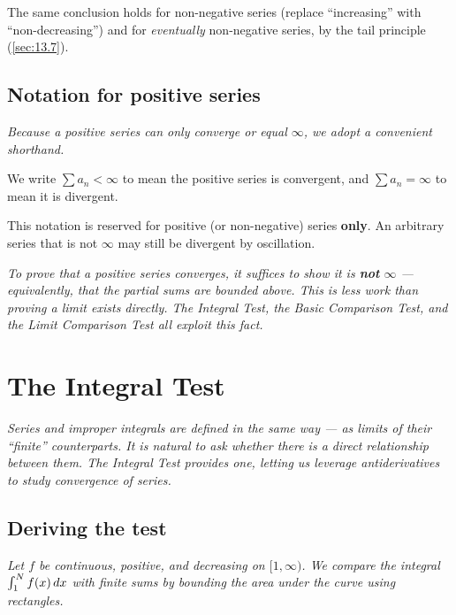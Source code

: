 \begin{remark}
The same conclusion holds for non-negative series (replace ``increasing'' with ``non-decreasing'') and for \emph{eventually} non-negative series, by the tail principle (\cref{sec:13.7}).
\end{remark}

\subsection*{Notation for positive series}

\textit{Because a positive series can only converge or equal $\infty$, we adopt a convenient shorthand.}

We write $\sum a_{n} < \infty$ to mean the positive series is convergent, and $\sum a_{n} = \infty$ to mean it is divergent.

\begin{remark}[Warning]
This notation is reserved for positive (or non-negative) series \textbf{only}.  An arbitrary series that is not $\infty$ may still be divergent by oscillation.
\end{remark}

\textit{To prove that a positive series converges, it suffices to show it is \textbf{not} $\infty$ --- equivalently, that the partial sums are bounded above.  This is less work than proving a limit exists directly.  The Integral Test, the Basic Comparison Test, and the Limit Comparison Test all exploit this fact.}

\section{The Integral Test}
\label{sec:13.10}

\textit{Series and improper integrals are defined in the same way --- as limits of their ``finite'' counterparts.  It is natural to ask whether there is a direct relationship between them.  The Integral Test provides one, letting us leverage antiderivatives to study convergence of series.}

\subsection*{Deriving the test}

\textit{Let $f$ be continuous, positive, and decreasing on $[1,\infty)$.  We compare the integral $\int_{1}^{N}f(x)\,dx$ with finite sums by bounding the area under the curve using rectangles.}

